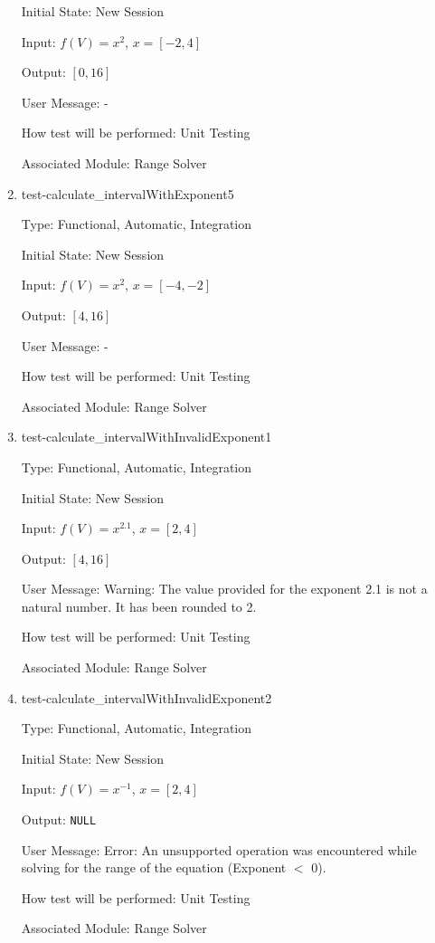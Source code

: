 \documentclass[12pt, titlepage]{article}
\begin{document}
\begin{enumerate}
	Initial State: New Session
	
	Input: $f(V) = x^2$, $x = [-2,4]$
	
	Output: $[0,16]$
	
	User Message: - 
	
	How test will be performed: Unit Testing
	
	Associated Module: Range Solver\\
	
	\item{test-calculate\_intervalWithExponent5}
	
	Type: Functional, Automatic, Integration
	
	Initial State: New Session
	
	Input: $f(V) = x^2$, $x = [-4,-2]$
	
	Output: $[4,16]$
	
	User Message: - 
	
	How test will be performed: Unit Testing
	
	Associated Module: Range Solver\\
	
	\item{test-calculate\_intervalWithInvalidExponent1}
	
	Type: Functional, Automatic, Integration
	
	Initial State: New Session
	
	Input: $f(V) = x^{2.1}$, $x = [2,4]$
	
	Output: $[4,16]$
	
	User Message: Warning: The value provided for the exponent 2.1 is not a 
	natural number. It has been rounded to 2.
	
	How test will be performed: Unit Testing
	
	Associated Module: Range Solver\\
	
	\item{test-calculate\_intervalWithInvalidExponent2}
	
	Type: Functional, Automatic, Integration
	
	Initial State: New Session
	
	Input: $f(V) = x^{-1}$, $x = [2,4]$
	
	Output: \texttt{NULL}
	
	User Message: Error: An unsupported operation was encountered while solving 
	for the range of the equation (Exponent $<$ 0).
	
	How test will be performed: Unit Testing
	
	Associated Module: Range Solver\\
	
\end{enumerate}
\end{document}
